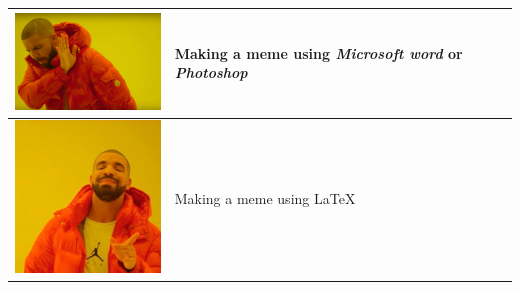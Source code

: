\documentclass{article}
\begin{document}
\large
\begin{tabular}{|p{1.75in}||p{1.75in}|}
    \hline
    \includegraphics[width=1.73in]{drake_no.jpg} &\vspace{-1.00in} Making a meme using \textit{Microsoft word} or \newline \textit{Photoshop} \\
    \hline
    \hline
    \includegraphics[width=1.73in]{drake_yes.png} &\vspace{-1.00in} Making a meme \newline using \LaTeX \\
    \hline
\end{tabular}
\end{document}
